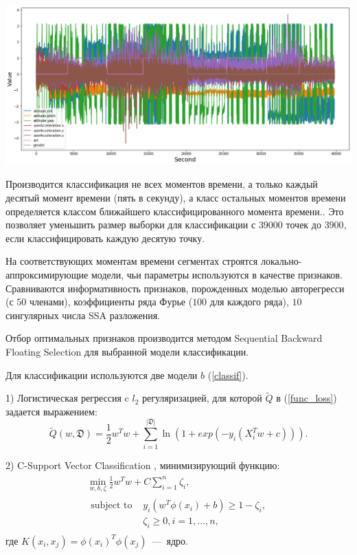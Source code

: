\documentclass[12pt, twoside]{article}
\begin{document}
\includegraphics[scale=0.43]{data}

Производится классификация не всех моментов времени, а только каждый десятый момент времени (пять в секунду), а класс остальных моментов времени определяется классом ближайшего классифицированного момента времени.. Это позволяет уменьшить размер выборки для классификации с $39000$ точек до $3900$, если классифицировать каждую десятую точку.

На соответствующих моментам времени сегментах строятся локально-аппроксимирующие модели, чьи параметры используются в качестве признаков. Сравниваются информативность признаков, порожденных моделью авторегресси (с $50$ членами), коэффициенты ряда Фурье ($100$ для каждого ряда), $10$ сингулярных числа SSA разложения. 

Отбор оптимальных признаков производится методом Sequential Backward Floating Selection \cite{Somol10} для выбранной модели классификации. 

Для классификации используются две модели $b$ (\ref{classif}).

1) Логистическая регрессия \cite{Peng02} c $l_2$ регуляризацией, для которой $\widetilde{Q}$ в (\ref{func_loss}) задается выражением:
$$\widetilde{Q}(w,\mathfrak{D}) = \frac{1}{2}w^Tw + \sum\limits_{i=1}^{|\mathfrak{D}|} \ln(1+exp(-y_i(X_i^Tw+c))).$$

2) C-Support Vector Classification \cite{Liu11}, минимизирующий функцию: 
\begin{align}\begin{aligned}\min_ {w, b, \zeta} \frac{1}{2} w^T w + C \sum_{i=1}^{n} \zeta_i,\\\begin{split}\textrm {subject to } & y_i (w^T \phi (x_i) + b) \geq 1 - \zeta_i,\\
& \zeta_i \geq 0, i=1, ..., n,\end{split}\end{aligned}\end{align}
где $K(x_i, x_j) = \phi (x_i)^T \phi (x_j)$~---~ядро.
\end{document}
